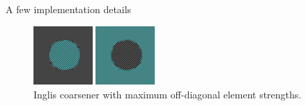 \documentclass[8pt]{beamer}
\begin{document}
\begin{frame}{A few implementation details}
   \begin{figure}[ht]
      \centering
      \includegraphics[width=0.2\textwidth]{checker_disk_60_seg_blend_segAMG_max_el_0000.png} \hspace{0.45cm}
      \includegraphics[width=0.2\textwidth]{checker_disk_60_seg_blend_segAMG_max_el_0001.png}
      ~\\Inglis coarsener with maximum off-diagonal element strengths.
   \end{figure}

\end{frame}
\end{document}
